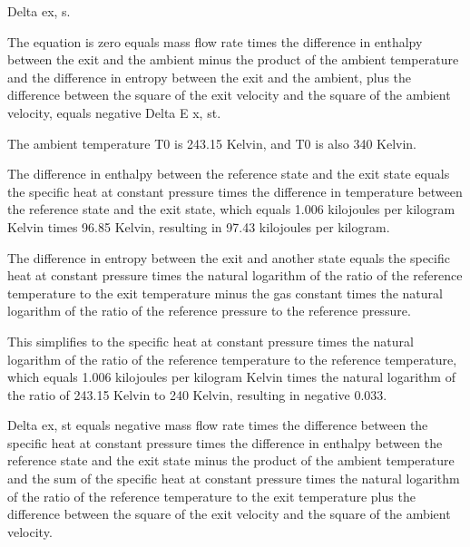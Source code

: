 Delta ex, s.

The equation is zero equals mass flow rate times the difference in enthalpy between the exit and the ambient minus the product of the ambient temperature and the difference in entropy between the exit and the ambient, plus the difference between the square of the exit velocity and the square of the ambient velocity, equals negative Delta E x, st.

The ambient temperature T0 is 243.15 Kelvin, and T0 is also 340 Kelvin.

The difference in enthalpy between the reference state and the exit state equals the specific heat at constant pressure times the difference in temperature between the reference state and the exit state, which equals 1.006 kilojoules per kilogram Kelvin times 96.85 Kelvin, resulting in 97.43 kilojoules per kilogram.

The difference in entropy between the exit and another state equals the specific heat at constant pressure times the natural logarithm of the ratio of the reference temperature to the exit temperature minus the gas constant times the natural logarithm of the ratio of the reference pressure to the reference pressure.

This simplifies to the specific heat at constant pressure times the natural logarithm of the ratio of the reference temperature to the reference temperature, which equals 1.006 kilojoules per kilogram Kelvin times the natural logarithm of the ratio of 243.15 Kelvin to 240 Kelvin, resulting in negative 0.033.

Delta ex, st equals negative mass flow rate times the difference between the specific heat at constant pressure times the difference in enthalpy between the reference state and the exit state minus the product of the ambient temperature and the sum of the specific heat at constant pressure times the natural logarithm of the ratio of the reference temperature to the exit temperature plus the difference between the square of the exit velocity and the square of the ambient velocity.